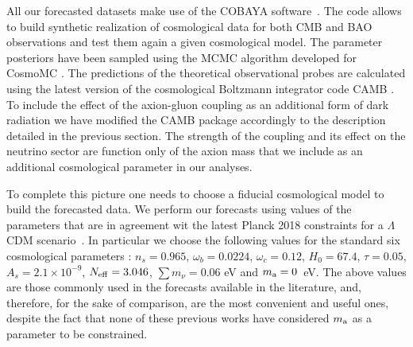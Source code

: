 \documentclass[fleqn,usenatbib,letters]{mnras}
\begin{document}
All our forecasted datasets  make use of the  \textsc{COBAYA} software~\citep{Torrado:2020xyz}. The code allows to build synthetic realization of cosmological data for both CMB and BAO observations and test them again a given cosmological model. The parameter posteriors have been sampled using the MCMC algorithm developed for CosmoMC \citep{Lewis:2002ah,Lewis:2013hha}.
The predictions of the theoretical observational probes are calculated using the latest version of the cosmological Boltzmann integrator code \textsc{CAMB} \citep{Lewis:1999bs,Howlett:2012mh}. To include the effect of the axion-gluon coupling as an additional form of dark radiation we have modified the \textsc{CAMB} package accordingly to the description detailed in the previous section. The strength of the coupling and its effect on the neutrino sector are function only of the axion mass that we include as an additional cosmological parameter in our analyses. 

To complete this picture one needs to choose a fiducial cosmological model to build the forecasted data. We perform our forecasts using values of the parameters that are in agreement wit the latest Planck 2018 constraints for a $\Lambda$CDM scenario~\citep{Aghanim:2018eyx}. In particular we choose the following values for the standard six cosmological parameters :  $n_s = 0.965$, 
$\omega_b = 0.0224$, $\omega_c = 0.12$, $H_0 = 67.4$, $\tau=0.05$, $A_s = 2.1 \times 10^{-9}$, $N_{\rm eff} = 3.046$, $\sum m_\nu = 0.06$ eV and $m_{\rm a}=0$~eV. The above values are those commonly used in the forecasts available in the literature, and, therefore, for the sake of comparison, are the most convenient and useful ones, despite the fact that none of these previous works have considered $m_{\rm a}$ as a parameter to be constrained. 
\end{document}
